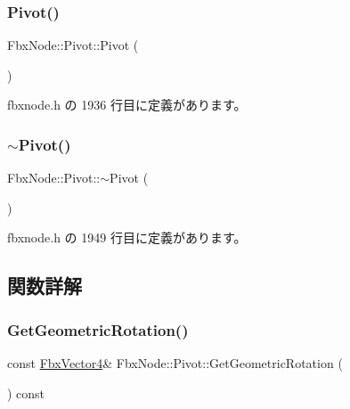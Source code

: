 \subsubsection{\texorpdfstring{Pivot()}{Pivot()}}
{\footnotesize\ttfamily Fbx\+Node\+::\+Pivot\+::\+Pivot (\begin{DoxyParamCaption}{ }\end{DoxyParamCaption})\hspace{0.3cm}{\ttfamily [inline]}}



 fbxnode.\+h の 1936 行目に定義があります。

\mbox{\label{class_fbx_node_1_1_pivot_a7eab88240f0f17103157caa8e6b8500a}} 
\subsubsection{\texorpdfstring{$\sim$\+Pivot()}{~Pivot()}}
{\footnotesize\ttfamily Fbx\+Node\+::\+Pivot\+::$\sim$\+Pivot (\begin{DoxyParamCaption}{ }\end{DoxyParamCaption})\hspace{0.3cm}{\ttfamily [inline]}}



 fbxnode.\+h の 1949 行目に定義があります。



\subsection{関数詳解}
\mbox{\label{class_fbx_node_1_1_pivot_a010ac2796535f1c6aa9df0548129ff29}} 
\subsubsection{\texorpdfstring{Get\+Geometric\+Rotation()}{GetGeometricRotation()}}
{\footnotesize\ttfamily const \hyperlink{class_fbx_vector4}{Fbx\+Vector4}\& Fbx\+Node\+::\+Pivot\+::\+Get\+Geometric\+Rotation (\begin{DoxyParamCaption}{ }\end{DoxyParamCaption}) const\hspace{0.3cm}{\ttfamily [inline]}}




